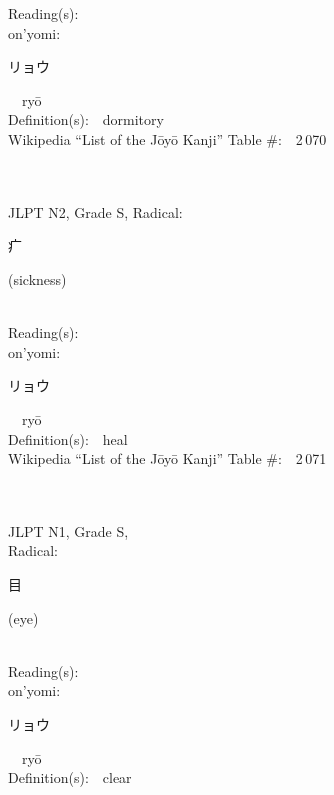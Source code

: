\begin{multicols}{2}
Reading(s):\ \ \\
{\hspace*{1em}}on'yomi:\ \ \\
{\hspace*{2em}}{\begin{CJK}{UTF8}{min} リョウ \end{CJK}}\ \ ry\=o\ \ \\
Definition(s):\ \ dormitory \\
Wikipedia ``List of the J\=oy\=o Kanji'' Table \#:\ \ 2\,070 \\
\ \ \\
{\fontsize{34pt}{40pt}  }\ \ \\  %
{JLPT N2, Grade S, Radical:\ \ {\begin{CJK}{UTF8}{min} 疒 \end{CJK}} (sickness) } \\
Reading(s):\ \ \\
{\hspace*{1em}}on'yomi:\ \ \\
{\hspace*{2em}}{\begin{CJK}{UTF8}{min} リョウ \end{CJK}}\ \ ry\=o\ \ \\
Definition(s):\ \ heal \\
Wikipedia ``List of the J\=oy\=o Kanji'' Table \#:\ \ 2\,071 \\
\ \ \\
{\fontsize{34pt}{40pt}  }\ \ \\
{JLPT N1, Grade S, \\Radical:\ \ {\begin{CJK}{UTF8}{min} 目 \end{CJK}} (eye) } \\
Reading(s):\ \ \\
{\hspace*{1em}}on'yomi:\ \ \\
{\hspace*{2em}}{\begin{CJK}{UTF8}{min} リョウ \end{CJK}}\ \ ry\=o\ \ \\
Definition(s):\ \ clear \\

\end{multicols}
